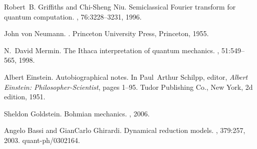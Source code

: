\documentclass[10pt]{article} %
\begin{document}
\begin{thebibliography}{10}
Robert~B. Griffiths and Chi-Sheng Niu.
\newblock Semiclassical {F}ourier transform for quantum computation.
, 76:3228--3231, 1996.

John von Neumann.
.
\newblock Princeton University Press, Princeton, 1955.

N.~David Mermin.
\newblock The {I}thaca interpretation of quantum mechanics.
, 51:549--565, 1998.

Albert Einstein.
\newblock Autobiographical notes.
\newblock In Paul~Arthur Schilpp, editor, {\em Albert Einstein:
  Philosopher-Scientist}, pages 1--95. Tudor Publishing Co., New York, 2d
  edition, 1951.

Sheldon Goldstein.
\newblock Bohmian mechanics.
, 2006.

Angelo Bassi and GianCarlo Ghirardi.
\newblock Dynamical reduction models.
, 379:257, 2003.
\newblock quant-ph/0302164.

\end{thebibliography}
\end{document}
